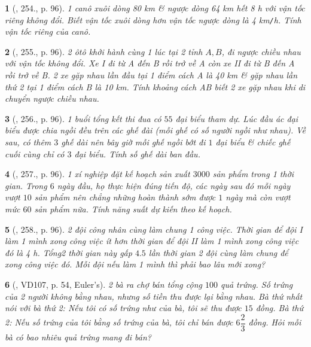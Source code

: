 \documentclass{article}
\newtheorem{baitoan}{}
\begin{document}
\begin{baitoan}[\cite{Tuyen_Toan_9_old}, 254., p. 96]
	1 canô xuôi dòng {\rm80 km} \& ngược dòng {\rm64 km} hết {\rm8 h} với vận tốc riêng không đổi. Biết vận tốc xuôi dòng hơn vận tốc ngược dòng là {\rm4 km{\tt/}h}. Tính vận tốc riêng của canô.
\end{baitoan}

\begin{baitoan}[\cite{Tuyen_Toan_9_old}, 255., p. 96]
	2 ôtô khởi hành cùng 1 lúc tại 2 tỉnh $A,B$, đi ngược chiều nhau với vận tốc không đổi. Xe I đi từ A đến B rồi trở về A còn xe II đi từ B đến A rồi trở về B. 2 xe gặp nhau lần đầu tại 1 điểm cách A là {\rm40 km} \& gặp nhau lần thứ 2 tại 1 điểm cách B là {\rm10 km}. Tính khoảng cách AB biết 2 xe gặp nhau khi di chuyển ngược chiều nhau.
\end{baitoan}

\begin{baitoan}[\cite{Tuyen_Toan_9_old}, 256., p. 96]
	1 buổi tổng kết thi đua có $55$ đại biểu tham dự. Lúc đầu ác đại biểu được chia ngồi đều trên các ghế đài (mỗi ghế có số người ngồi như nhau). Về sau, có thêm $3$ ghế dài nên bây giờ mỗi ghế ngồi bớt đi $1$ đại biểu \& chiếc ghế cuối cùng chỉ có $3$ đại biểu. Tính số ghế dài ban đầu.
\end{baitoan}

\begin{baitoan}[\cite{Tuyen_Toan_9_old}, 257., p. 96]
	1 xí nghiệp đặt kế hoạch sản xuất $3000$ sản phẩm trong 1 thời gian. Trong $6$ ngày đầu, họ thực hiện đúng tiến độ, các ngày sau đó mỗi ngày vượt $10$ sản phẩm nên chẳng những hoàn thành sớm được $1$ ngày mà còn vượt mức $60$ sản phẩm nữa. Tính năng suất dự kiến theo kế hoạch.
\end{baitoan}

\begin{baitoan}[\cite{Tuyen_Toan_9_old}, 258., p. 96]
	2 đội công nhân cùng làm chung 1 công việc. Thời gian để đội I làm 1 mình xong công việc ít hơn thời gian để đội II làm 1 mình xong công việc đó là {\rm4 h}. Tổng2 thời gian này gấp $4.5$ lần thời gian 2 đội cùng làm chung để xong công việc đó. Mỗi đội nếu làm 1 mình thì phải bao lâu mới xong?
\end{baitoan}

\begin{baitoan}[\cite{Binh_Toan_9_tap_2}, VD107, p. 54, Euler's]
	2 bà ra chợ bán tổng cộng $100$ quả trứng. Số trứng của 2 người không bằng nhau, nhưng số tiền thu được lại bằng nhau. Bà thứ nhất nói với bà thứ 2: Nếu tôi có số trứng như của bà, tôi sẽ thu được $15$ đồng. Bà thứ 2: Nếu số trứng của tôi bằng số trứng của bà, tôi chỉ bán được $6\dfrac{2}{3}$ đồng. Hỏi mỗi bà có bao nhiêu quả trứng mang đi bán?
\end{baitoan}
\end{document}
